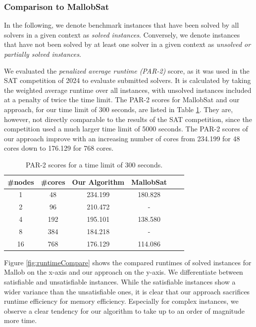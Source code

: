 \documentclass[12pt,a4paper,twoside]{scrartcl}
\numberwithin{equation}{section}
\begin{document}
\subsubsection{Comparison to MallobSat}
\label{sec:compare}

In the following, we denote benchmark instances that have been solved by all solvers in a given context as \textit{solved instances}. Conversely, we denote instances that have not been solved by at least one solver in a given context as \textit{unsolved or partially solved instances}.

We evaluated the \textit{penalized average runtime (PAR-2)} score, as it was used in the SAT competition \cite{satCompWebsite} of 2024 to evaluate submitted solvers. It is calculated by taking the weighted average runtime over all instances, with unsolved instances included at a penalty of twice the time limit. The PAR-2 scores for MallobSat and our approach, for our time limit of 300 seconds, are listed in Table \ref{tab:par2}. They are, however, not directly comparable to the results of the SAT competition, since the competition used a much larger time limit of 5000 seconds. The PAR-2 scores of our approach improve with an increasing number of cores from 234.199 for 48 cores down to 176.129 for 768 cores.

\begin{table}[!h]
  \center
  \begin{tabular}{ cccccc }
    \toprule
    \#nodes & \#cores & Our Algorithm & MallobSat\\
    \midrule
    1  & 48  & 234.199 & 180.828\\
    2  & 96  & 210.472 & -\\
    4  & 192 & 195.101 & 138.580\\
    8  & 384 & 184.218 & -\\
    16 & 768 & 176.129 & 114.086\\
    \bottomrule
  \end{tabular}
  \caption{PAR-2 scores for a time limit of 300 seconds.}
  \label{tab:par2}
\end{table}

Figure \ref{fig:runtimeCompare} shows the compared runtimes of solved instances for Mallob on the x-axis and our approach on the y-axis. We differentiate between satisfiable and unsatisfiable instances. While the satisfiable instances show a wider variance than the unsatisfiable ones, it is clear that our approach sacrifices runtime efficiency for memory efficiency. Especially for complex instances, we observe a clear tendency for our algorithm to take up to an order of magnitude more time.
\end{document}
